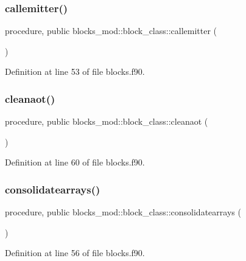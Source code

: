\subsubsection{\texorpdfstring{callemitter()}{callemitter()}}
{\footnotesize\ttfamily procedure, public blocks\+\_\+mod\+::block\+\_\+class\+::callemitter (\begin{DoxyParamCaption}{ }\end{DoxyParamCaption})}



Definition at line 53 of file blocks.\+f90.

\mbox{\label{structblocks__mod_1_1block__class_ab58da434b2813d158b3f688d3c60d02c}} 
\subsubsection{\texorpdfstring{cleanaot()}{cleanaot()}}
{\footnotesize\ttfamily procedure, public blocks\+\_\+mod\+::block\+\_\+class\+::cleanaot (\begin{DoxyParamCaption}{ }\end{DoxyParamCaption})}



Definition at line 60 of file blocks.\+f90.

\mbox{\label{structblocks__mod_1_1block__class_a68f5bb0cb32b5b51cffd66d472cc45f0}} 
\subsubsection{\texorpdfstring{consolidatearrays()}{consolidatearrays()}}
{\footnotesize\ttfamily procedure, public blocks\+\_\+mod\+::block\+\_\+class\+::consolidatearrays (\begin{DoxyParamCaption}{ }\end{DoxyParamCaption})}



Definition at line 56 of file blocks.\+f90.

